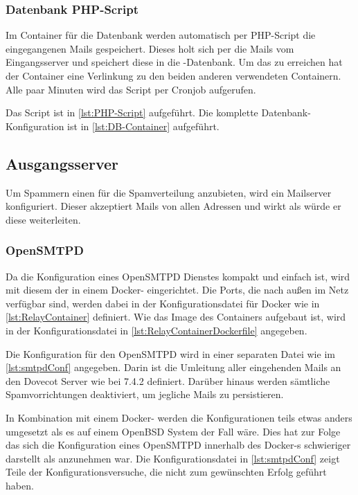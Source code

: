 \documentclass[a4paper,11pt,singlespacing]{article}
\begin{document}
		\subsubsection{Datenbank PHP-Script}\label{DB-Hook-Container}
			Im Container für die Datenbank werden automatisch per PHP-Script die eingegangenen Mails gespeichert. 
			Dieses holt sich per  die Mails vom Eingangsserver und speichert diese in die -Datenbank.
			Um das zu erreichen hat der Container eine Verlinkung zu den beiden anderen verwendeten Containern.
			Alle paar Minuten wird das Script per Cronjob aufgerufen.

			Das Script ist in \autoref{lst:PHP-Script} aufgeführt.
			Die komplette Datenbank-Konfiguration ist in \autoref{lst:DB-Container} aufgeführt.

	\subsection{Ausgangsserver}\label{sec:UmsetzungOpenRelay}
		Um Spammern einen  für die Spamverteilung anzubieten, wird ein Mailserver konfiguriert.
		Dieser akzeptiert Mails von allen Adressen und wirkt als würde er diese weiterleiten.
		
		\subsubsection{OpenSMTPD}\label{OpenRelayOpenSMTPD}
			Da die Konfiguration eines \textsf{OpenSMTPD} Dienstes kompakt und einfach ist, wird mit diesem der  in einem Docker- eingerichtet.
			Die Ports, die nach au{\ss}en im Netz verfügbar sind, werden dabei in der Konfigurationsdatei für Docker wie in \autoref{lst:RelayContainer} definiert.
			Wie das Image des Containers aufgebaut ist, wird in der Konfigurationsdatei in \autoref{lst:RelayContainerDockerfile} angegeben.

			Die Konfiguration für den \textsf{OpenSMTPD} wird in einer separaten Datei wie im \autoref{lst:smtpdConf} angegeben.
			Darin ist die Umleitung aller eingehenden Mails an den Dovecot Server wie bei 7.4.2 definiert.
			Darüber hinaus werden sämtliche Spamvorrichtungen deaktiviert, um jegliche Mails zu persistieren.

			In Kombination mit einem Docker- werden die Konfigurationen teils etwas anders umgesetzt als es auf einem OpenBSD System der Fall wäre.
			Dies hat zur Folge das sich die Konfiguration eines \textsf{OpenSMTPD} innerhalb des Docker-s schwieriger darstellt als anzunehmen war.
			Die Konfigurationsdatei in \autoref{lst:smtpdConf} zeigt Teile der Konfigurationsversuche, die nicht zum gewünschten Erfolg geführt haben.
\end{document}

